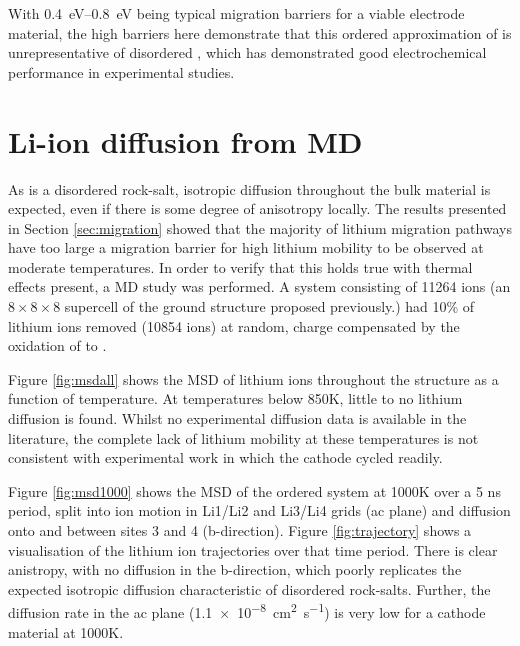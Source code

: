 With \SIrange{0.4}{0.8}{\electronvolt} being typical migration barriers for a viable electrode material, the high barriers here demonstrate that this ordered approximation of  is unrepresentative of disordered , which has demonstrated good electrochemical performance in experimental studies.\cite{Freire2016}
\newpage

\section{Li-ion diffusion from MD}

As  is a disordered rock-salt, isotropic diffusion throughout the bulk material is expected, even if there is some degree of anisotropy locally.
The results presented in Section \ref{sec:migration} showed that the majority of lithium migration pathways have too large a migration barrier for high lithium mobility to be observed at moderate temperatures.
In order to verify that this holds true with thermal effects present, a MD study was performed.
A system consisting of 11264 ions (an $8 \times 8 \times 8$ supercell of the ground structure proposed previously.\cite{Diaz-Lopez2017}) had 10\% of lithium ions removed (10854 ions) at random, charge compensated by the oxidation of  to .

Figure \ref{fig:msdall} shows the MSD of lithium ions throughout the structure as a function of temperature.
At temperatures below 850K, little to no lithium diffusion is found.
Whilst no experimental diffusion data is available in the literature, the complete lack of lithium mobility at these temperatures is not consistent with experimental work in which the cathode cycled readily.

Figure \ref{fig:msd1000} shows the MSD of the ordered  system at 1000K over a 5 ns period, split into ion motion in Li1/Li2 and Li3/Li4 grids (ac plane) and diffusion onto and between sites 3 and 4 (b-direction).
Figure \ref{fig:trajectory} shows a visualisation of the lithium ion trajectories over that time period.
There is clear anistropy, with no diffusion in the b-direction, which poorly replicates the expected isotropic diffusion characteristic of disordered rock-salts.
Further, the diffusion rate in the ac plane (\SI{1.1e-8}{\centi\meter\squared\per\second}) is very low for a cathode material at 1000K. 


